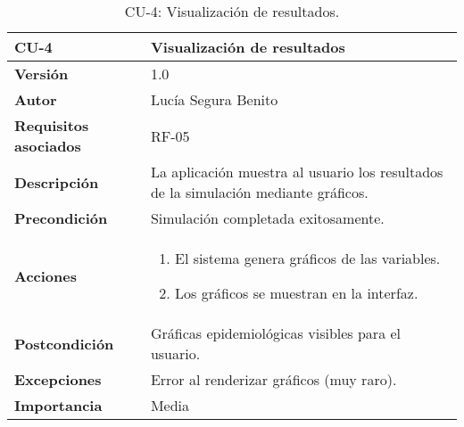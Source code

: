 \begin{table}[H]
\centering
\begin{tabular}{|p{3cm}|p{9cm}|}
\hline
\textbf{CU-4} & \textbf{Visualización de resultados} \\
\hline
\textbf{Versión} & 1.0 \\
\hline
\textbf{Autor} & Lucía Segura Benito \\
\hline
\textbf{Requisitos asociados} & RF-05 \\
\hline
\textbf{Descripción} & La aplicación muestra al usuario los resultados de la simulación mediante gráficos. \\
\hline
\textbf{Precondición} & Simulación completada exitosamente. \\
\hline
\textbf{Acciones} &
\begin{enumerate}
    \item El sistema genera gráficos de las variables.
    \item Los gráficos se muestran en la interfaz.
\end{enumerate}
\\
\hline
\textbf{Postcondición} & Gráficas epidemiológicas visibles para el usuario. \\
\hline
\textbf{Excepciones} & Error al renderizar gráficos (muy raro). \\
\hline
\textbf{Importancia} & Media \\
\hline
\end{tabular}
\caption{CU-4: Visualización de resultados.}
\label{tab:cu4}
\end{table}




